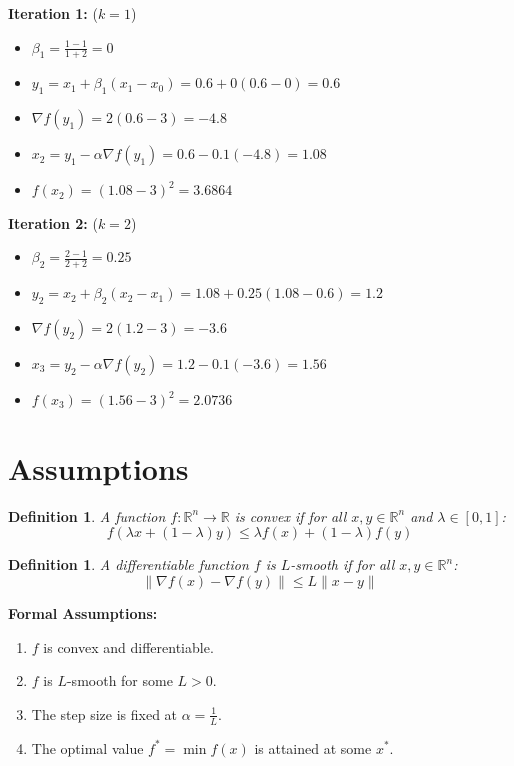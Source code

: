 \documentclass{article}
\newtheorem{definition}[theorem]{Definition}
\begin{document}
\textbf{Iteration 1:} ($k=1$)
\begin{itemize}
\item $\beta_1 = \frac{1-1}{1+2} = 0$
\item $y_1 = x_1 + \beta_1(x_1 - x_0) = 0.6 + 0(0.6 - 0) = 0.6$
\item $\nabla f(y_1) = 2(0.6 - 3) = -4.8$
\item $x_2 = y_1 - \alpha \nabla f(y_1) = 0.6 - 0.1(-4.8) = 1.08$
\item $f(x_2) = (1.08 - 3)^2 = 3.6864$
\end{itemize}

\textbf{Iteration 2:} ($k=2$)
\begin{itemize}
\item $\beta_2 = \frac{2-1}{2+2} = 0.25$
\item $y_2 = x_2 + \beta_2(x_2 - x_1) = 1.08 + 0.25(1.08 - 0.6) = 1.2$
\item $\nabla f(y_2) = 2(1.2 - 3) = -3.6$
\item $x_3 = y_2 - \alpha \nabla f(y_2) = 1.2 - 0.1(-3.6) = 1.56$
\item $f(x_3) = (1.56 - 3)^2 = 2.0736$
\end{itemize}

\section*{Assumptions}
\begin{definition}
A function $f: \mathbb{R}^n \to \mathbb{R}$ is convex if for all $x, y \in \mathbb{R}^n$ and $\lambda \in [0,1]$:
$$f(\lambda x + (1-\lambda)y) \leq \lambda f(x) + (1-\lambda) f(y)$$
\end{definition}

\begin{definition}
A differentiable function $f$ is $L$-smooth if for all $x, y \in \mathbb{R}^n$:
$$\|\nabla f(x) - \nabla f(y)\| \leq L \|x - y\|$$
\end{definition}

\textbf{Formal Assumptions:}
\begin{enumerate}
\item $f$ is convex and differentiable.
\item $f$ is $L$-smooth for some $L > 0$.
\item The step size is fixed at $\alpha = \frac{1}{L}$.
\item The optimal value $f^* = \min f(x)$ is attained at some $x^*$.
\end{enumerate}
\end{document}
